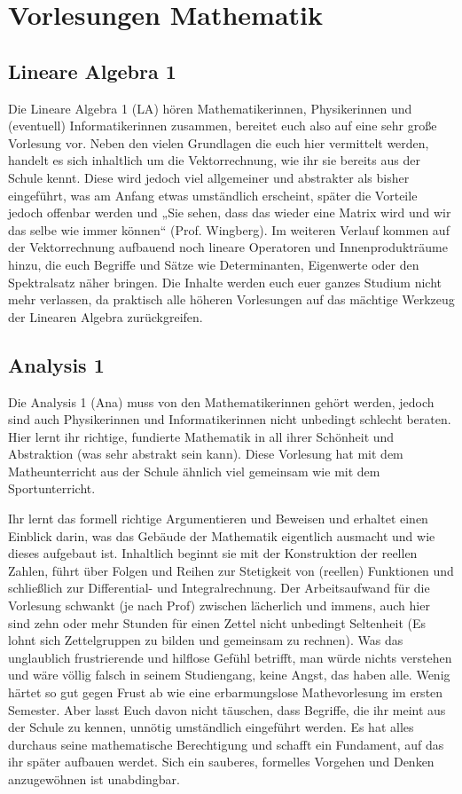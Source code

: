 \section{Vorlesungen Mathematik}

\subsection{Lineare Algebra 1}
\label{la1}
Die Lineare Algebra 1 (\gls{LA}) hören Mathematikerinnen, Physikerinnen und (eventuell) Informatikerinnen zusammen, bereitet euch also auf eine sehr große Vorlesung vor. Neben den vielen Grundlagen die euch hier vermittelt werden,  handelt es sich inhaltlich um die Vektorrechnung, wie ihr sie bereits aus der Schule kennt. Diese wird jedoch viel allgemeiner und abstrakter als bisher eingeführt, was am Anfang etwas umständlich erscheint, später die Vorteile jedoch offenbar werden und „Sie sehen, dass das wieder eine Matrix wird und wir das selbe wie immer können“ (Prof. Wingberg). Im weiteren Verlauf kommen auf der Vektorrechnung aufbauend noch lineare Operatoren und Innenprodukträume hinzu, die euch Begriffe und Sätze wie Determinanten, Eigenwerte oder den Spektralsatz näher bringen. Die Inhalte werden euch euer ganzes Studium nicht mehr verlassen, da praktisch alle höheren Vorlesungen auf das mächtige Werkzeug der Linearen Algebra zurückgreifen.

\subsection{Analysis 1}
\label{ana1}
Die Analysis 1 (\gls{Ana}) muss von den Mathematikerinnen gehört werden, jedoch sind auch Physikerinnen und Informatikerinnen nicht unbedingt schlecht beraten. Hier lernt ihr richtige, fundierte Mathematik in all ihrer Schönheit und Abstraktion (was sehr abstrakt sein kann). Diese Vorlesung hat mit dem Matheunterricht aus der Schule ähnlich viel gemeinsam wie mit dem Sportunterricht.

Ihr lernt das formell richtige Argumentieren und Beweisen und erhaltet einen Einblick darin, was das Gebäude der Mathematik eigentlich ausmacht und wie dieses aufgebaut ist. Inhaltlich beginnt sie mit der Konstruktion der reellen Zahlen, führt über Folgen und Reihen zur Stetigkeit von (reellen) Funktionen und schließlich zur Differential- und Integralrechnung. Der Arbeitsaufwand für die Vorlesung schwankt (je nach Prof) zwischen lächerlich und immens, auch hier sind zehn oder mehr Stunden für einen Zettel nicht unbedingt Seltenheit (Es lohnt sich Zettelgruppen zu bilden und gemeinsam zu rechnen). Was das unglaublich frustrierende und hilflose Gefühl betrifft, man würde nichts verstehen und wäre völlig falsch in seinem Studiengang, keine Angst, das haben alle. Wenig härtet so gut gegen Frust ab wie eine erbarmungslose Mathevorlesung im ersten Semester. Aber lasst Euch davon nicht täuschen, dass Begriffe, die ihr meint aus der Schule zu kennen, unnötig umständlich eingeführt werden. Es hat alles durchaus seine mathematische Berechtigung und schafft ein Fundament, auf das ihr später aufbauen werdet. Sich ein sauberes, formelles Vorgehen und Denken anzugewöhnen ist unabdingbar.

